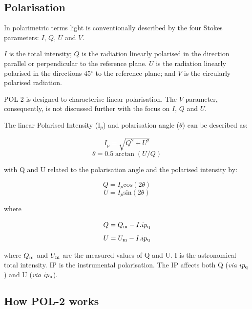 \subsection*{Polarisation}

In polarimetric terms light is conventionally described by the four
Stokes parameters: $I$, $Q$, $U$ and $V$.


$I$ is the total intensity; $Q$ is the radiation linearly polarised in
the direction parallel or perpendicular to the reference plane. $U$ is
the radiation linearly polarised in the directions 45$^{\circ }$ to
the reference plane; and $V$ is the circularly polarised radiation.

POL-2 is designed to characterise linear polarisation.  The $V$
parameter, consequently, is not discussed further with the focus on $I$,
$Q$ and $U$.

The linear Polarised Intensity (I$_{p}$) and  polarisation angle
($\theta$) can be described as:

\begin{equation}
I_{p} = \sqrt{Q^{2}+U^{2}}
\end{equation}
\begin{equation}
\theta = 0.5\arctan(U/Q)
\end{equation}

with Q and U related to the polarisation angle and the polarised intensity by:

\begin{equation}
Q = I_{p} \text{cos}(2\theta)
\end{equation}
\begin{equation}
U = I_{p} \text{sin}(2\theta)
\end{equation}

where

\begin{equation}
Q = Q_{\textnormal{m}} - I. ip_{\textnormal{q}}
\end{equation}
\begin{equation}
U = U_{\textnormal{m}} - I. ip_{\textnormal{u}}
\end{equation}

where $Q_{\textnormal{m}}$ and $U_{\textnormal{m}}$ are the measured values
of Q and U.  I is the astronomical total intensity.  IP is the instrumental
polarisation. The IP affects both Q (\emph{via} $ip_{\textnormal{q}}$) and U
(\emph{via} $ip_{\textnormal{u}}$).


\subsection*{How POL-2 works}

